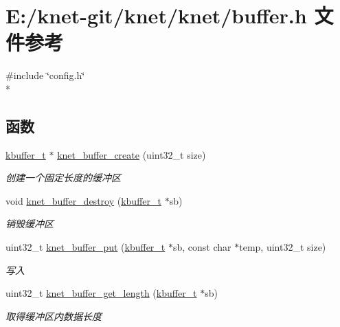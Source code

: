 \hypertarget{a00047}{}\section{E\+:/knet-\/git/knet/knet/buffer.h 文件参考}
\label{a00047}
{\ttfamily \#include \char`\"{}config.\+h\char`\"{}}\\*
\subsection*{函数}
\begin{DoxyCompactItemize}
\item 
\hyperlink{a00053_a4b09a7574cd440f9b94285ab73c81b4e_a4b09a7574cd440f9b94285ab73c81b4e}{kbuffer\+\_\+t} $\ast$ \hyperlink{a00047_ab7c640d7d31868f39679942dafd12175_ab7c640d7d31868f39679942dafd12175}{knet\+\_\+buffer\+\_\+create} (uint32\+\_\+t size)
\begin{DoxyCompactList}\small\item\em 创建一个固定长度的缓冲区 \end{DoxyCompactList}\item 
void \hyperlink{a00047_ad7934fdee7f0eea3f1581b5dd94736e2_ad7934fdee7f0eea3f1581b5dd94736e2}{knet\+\_\+buffer\+\_\+destroy} (\hyperlink{a00053_a4b09a7574cd440f9b94285ab73c81b4e_a4b09a7574cd440f9b94285ab73c81b4e}{kbuffer\+\_\+t} $\ast$sb)
\begin{DoxyCompactList}\small\item\em 销毁缓冲区 \end{DoxyCompactList}\item 
uint32\+\_\+t \hyperlink{a00047_abf453d69e41199e1f64314d31ff23a69_abf453d69e41199e1f64314d31ff23a69}{knet\+\_\+buffer\+\_\+put} (\hyperlink{a00053_a4b09a7574cd440f9b94285ab73c81b4e_a4b09a7574cd440f9b94285ab73c81b4e}{kbuffer\+\_\+t} $\ast$sb, const char $\ast$temp, uint32\+\_\+t size)
\begin{DoxyCompactList}\small\item\em 写入 \end{DoxyCompactList}\item 
uint32\+\_\+t \hyperlink{a00047_a8d22cd2f8625aee29cbf263e0fba8cef_a8d22cd2f8625aee29cbf263e0fba8cef}{knet\+\_\+buffer\+\_\+get\+\_\+length} (\hyperlink{a00053_a4b09a7574cd440f9b94285ab73c81b4e_a4b09a7574cd440f9b94285ab73c81b4e}{kbuffer\+\_\+t} $\ast$sb)
\begin{DoxyCompactList}\small\item\em 取得缓冲区内数据长度 \end{DoxyCompactList}\item 

\end{DoxyCompactItemize}
